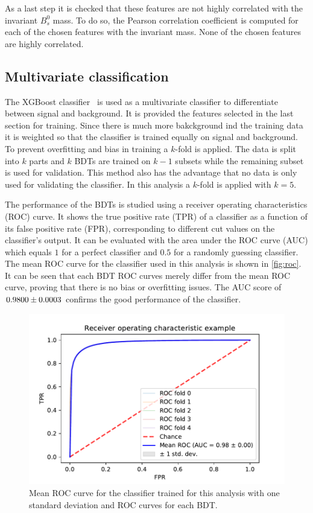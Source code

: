 As a last step it is checked that these features are not highly correlated with the invariant $B^0_s$ mass. To do so, the Pearson correlation coefficient is computed for each of the chosen features with the invariant mass. None of the chosen features are highly correlated.

\subsection{Multivariate classification}
The XGBoost classifier~\cite{Chen:2016:XST:2939672.2939785} is used as a multivariate classifier to differentiate between signal and background. It is provided the features selected in the last section for training. Since there is much more bakckground ind the training data it is weighted so that the classifier is trained equally on signal and background. To prevent overfitting and bias in training a $k$-fold is applied. The data is split into $k$ parts and $k$ BDTs are trained on $k - 1$ subsets while the remaining subset is used for validation. This method also has the advantage that no data is only used for validating the classifier. In this analysis a $k$-fold is applied with $k = 5$.

The performance of the BDTs is studied using a receiver operating characteristics (ROC) curve. It shows the true positive rate (TPR) of a classifier as a function of its false positive rate (FPR), corresponding to different cut values on the classifier's output. It can be evaluated with the area under the ROC curve (AUC) which equals $1$ for a perfect classifier and $0.5$ for a randomly guessing classifier. The mean ROC curve for the classifier used in this analysis is shown in \autoref{fig:roc}. It can be seen that each BDT ROC curves merely differ from the mean ROC curve, proving that there is no bias or overfitting issues. The AUC score of $\num{0.98 \pm 0.0003}$ confirms the good performance of the classifier.

\begin{figure}[tb]
  \centering
  \includegraphics[width=.8\textwidth]{plots/roc.pdf}
  \caption{Mean ROC curve for the classifier trained for this analysis with one standard deviation and ROC curves for each BDT.}
  \label{fig:roc}
\end{figure}


